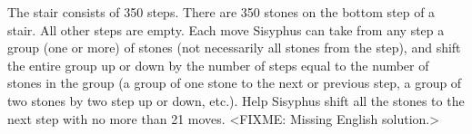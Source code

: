 \problem
The stair consists of 350 steps.
There are 350 stones on the bottom step of a stair.
All other steps are empty.
Each move Sisyphus can take from any step a group (one or more) of stones
(not necessarily all stones from the step), and shift the entire group up or
down by the number of steps equal to the number of stones in the group
(a group of one stone to the next or previous step, a group of two stones by
two step up or down, etc.).
Help Sisyphus shift all the stones to the next step with no more than
21 moves.
\solution
<FIXME: Missing English solution.>
\endproblem
